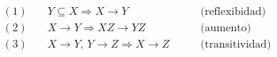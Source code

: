 \documentclass[preview]{standalone}
\begin{document}
\begin{align*}
(1) & \quad  Y  \subseteq X  \Rightarrow X\rightarrow Y  &\quad\quad  \text{(reflexibidad)}\\
(2) & \quad  X\rightarrow Y    \Rightarrow XZ\rightarrow YZ  &\quad\quad  \text{(aumento)}\\
(3) & \quad  X\rightarrow Y\text{, }  Y\rightarrow Z   \Rightarrow X\rightarrow Z  &\quad\quad  \text{(transitividad)}\\
\end{align*}
\end{document}
